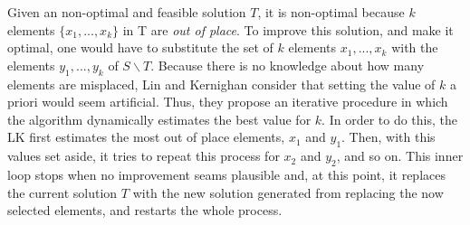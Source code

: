 Given an non-optimal and feasible solution $T$, it is non-optimal because $k$ elements $\{x_1, ..., x_k\}$ in T are \textit{out of place}. To improve this solution, and make it optimal, one would have to substitute the set of $k$ elements $x_1, ..., x_k$ with the elements $y_1, ..., y_k$ of $S \backslash T$. Because there is no knowledge about how many elements are misplaced, Lin and Kernighan consider that setting the value of $k$ a priori would seem artificial. Thus, they propose an iterative procedure in which the algorithm dynamically estimates the best value for $k$. In order to do this, the LK first estimates the most out of place elements, $x_1$ and $y_1$. Then, with this values set aside, it tries to repeat this process for $x_2$ and $y_2$, and so on. This inner loop stops when no improvement seams plausible and, at this point, it replaces the current solution $T$ with the new solution generated from replacing the now selected elements, and restarts the whole process. 



